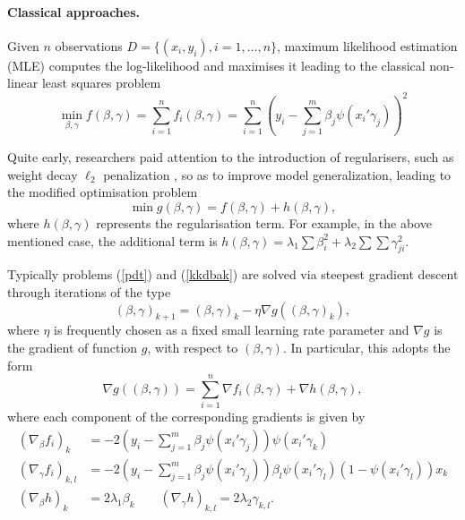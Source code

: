 \paragraph{Classical approaches.}\label{sanchez}

Given $n$ observations $D=\{ (x_i, y_i), i=1,...,n \}$,
 maximum likelihood estimation (MLE) 
 computes the log-likelihood and maximises it 
leading to the classical non-linear least squares problem
\begin{equation}\label{pdt}
 \min_{\beta , \gamma } f (\beta , \gamma) = \sum _{i=1}^n f_i(\beta, \gamma)  =\sum _{i=1}^n \left( y_i -
  \sum_{j=1}^m \beta_j \psi(x_i'\gamma_j) \right)^2 
 \end{equation}

\noindent Quite early, researchers paid attention to the introduction of regularisers, such as weight decay $\ell_2$ penalization \cite{krogh1992simple}, so as to improve model 
generalization, leading to the modified optimisation problem
\begin{equation}\label{kkdbak}
 \min  g(\beta ,\gamma) = f (\beta ,\gamma ) +
 h (\beta ,\gamma ), \end{equation}
where $h(\beta , \gamma )$ represents the regularisation 
term. For example, in the above mentioned case, the 
additional term is  
$h(\beta , \gamma )= \lambda _1 \sum \beta_i ^2 +
\lambda _2 \sum \sum \gamma _{ji} ^2$. 

Typically problems (\ref{pdt}) and (\ref{kkdbak}) are solved via steepest gradient descent \cite{meza} through iterations of the type
\[
   (\beta, \gamma )_{k+1}=
   (\beta, \gamma )_{k}- \eta \nabla g (  (\beta, \gamma )_{k} ),
   \]
where $\eta $ is frequently chosen as a fixed small learning rate parameter and $\nabla g $ is the gradient of function $g$, with respect to 
$(\beta ,\gamma )$. In particular, this adopts the form 
\begin{equation}\label{gradiente1}
    \nabla g (  (\beta, \gamma )  )= \sum _{i=1}^n   \nabla f_i(\beta, \gamma) +  \nabla  h(\beta, \gamma),
    \end{equation}
    where each component of the corresponding gradients is given by 
\begin{align*}
(\nabla_\beta f_i)_k &= -2  \left(y_i - \sum_{j=1}^m \beta_j \psi(x_i' \gamma_j)\right) \psi(x_i' \gamma_k) \\
(\nabla_\gamma f_i)_{k,l} &= -2 \left (y_i - \sum_{j=1}^m \beta_j \psi(x_i' \gamma_j)\right) \beta_l \psi(x_i' \gamma_l)(1 - \psi(x_i' \gamma_l)) x_k \\
(\nabla_\beta h)_k &= 2\lambda_1 \beta_k  \qquad (\nabla_\gamma h)_{k,l} = 2\lambda_2 \gamma_{k,l}.
\end{align*}

